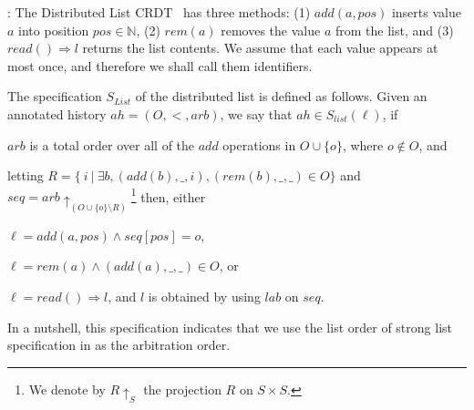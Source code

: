 \bigskip
{}:
The Distributed List CRDT~\cite{...} has three methods: (1)
$\mathit{add}(a,\mathit{pos})$ inserts value $a$ into position
$\mathit{pos} \in \mathbb{N}$, (2) $\mathit{rem}(a)$ removes the
value $a$ from the list, and (3) $\mathit{read}() \Rightarrow l$
returns the list contents.
%
We assume that each value appears at most once, and therefore we shall
call them identifiers.

The specification $S_{\mathit{List}}$ of the distributed list is
defined as follows.
Given an annotated history $ah = (O,<,\mathit{arb})$, we say that $ ah
\in S_{\mathit{list}}(\ell)$, if
\begin{inparaenum}[(1)]
\item $arb$ is a total order over all of the $add$ operations in $O \cup \{ o \}$, where $o \notin O$, and
\item letting \mbox{$R = \{\ i\ |\ \exists b,
    (add(b),\_,i),(rem(b),\_,\_) \in O \}$} and $\mathit{seq} =
  \mathit{arb}\!\!\!\uparrow_{( O \cup \{ o \} \setminus R)}$\footnote{We denote by $R \uparrow_{S}$ the projection $R$ on $S \times S$.}
  then, either
    \begin{inparaenum}[(i)]
    \item $\ell = add(a,pos) \wedge \mathit{seq}[pos] = o$,
    \item $\ell = rem(a) \wedge (add(a),\_,\_) \in O$, or
    \item $\ell = read() \Rightarrow l$, and $l$ is obtained by using $\mathit{lab}$ on $\mathit{seq}$.
    \end{inparaenum}
  \end{inparaenum}
In a nutshell, this specification indicates that we use the list order
of strong list specification in \cite{Attiya:2016} as the arbitration
order.

